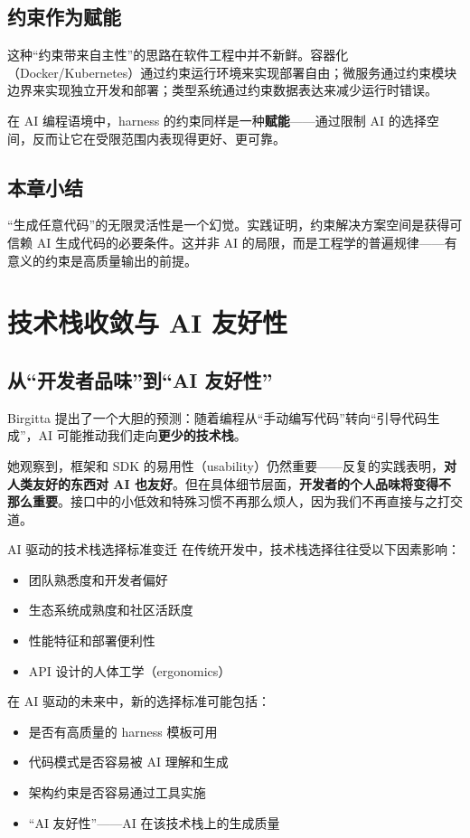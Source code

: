 \documentclass[a4paper]{article}
\begin{document}
\subsection{约束作为赋能}

这种``约束带来自主性''的思路在软件工程中并不新鲜。容器化（Docker/Kubernetes）通过约束运行环境来实现部署自由；微服务通过约束模块边界来实现独立开发和部署；类型系统通过约束数据表达来减少运行时错误。

在 AI 编程语境中，harness 的约束同样是一种\textbf{赋能}------通过限制 AI 的选择空间，反而让它在受限范围内表现得更好、更可靠。

\subsection{本章小结}

``生成任意代码''的无限灵活性是一个幻觉。实践证明，约束解决方案空间是获得可信赖 AI 生成代码的必要条件。这并非 AI 的局限，而是工程学的普遍规律------有意义的约束是高质量输出的前提。

\newpage

\section{技术栈收敛与 AI 友好性}

\subsection{从``开发者品味''到``AI 友好性''}

Birgitta 提出了一个大胆的预测：随着编程从``手动编写代码''转向``引导代码生成''，AI 可能推动我们走向\textbf{更少的技术栈}。

她观察到，框架和 SDK 的易用性（usability）仍然重要------反复的实践表明，\textbf{对人类友好的东西对 AI 也友好}。但在具体细节层面，\textbf{开发者的个人品味将变得不那么重要}。接口中的小低效和特殊习惯不再那么烦人，因为我们不再直接与之打交道。

\begin{knowledgebox}{AI 驱动的技术栈选择标准变迁}
在传统开发中，技术栈选择往往受以下因素影响：
\begin{itemize}[leftmargin=1.5em]
    \item 团队熟悉度和开发者偏好
    \item 生态系统成熟度和社区活跃度
    \item 性能特征和部署便利性
    \item API 设计的人体工学（ergonomics）
\end{itemize}

在 AI 驱动的未来中，新的选择标准可能包括：
\begin{itemize}[leftmargin=1.5em]
    \item 是否有高质量的 harness 模板可用
    \item 代码模式是否容易被 AI 理解和生成
    \item 架构约束是否容易通过工具实施
    \item ``AI 友好性''------AI 在该技术栈上的生成质量
\end{itemize}
\end{knowledgebox}
\end{document}
